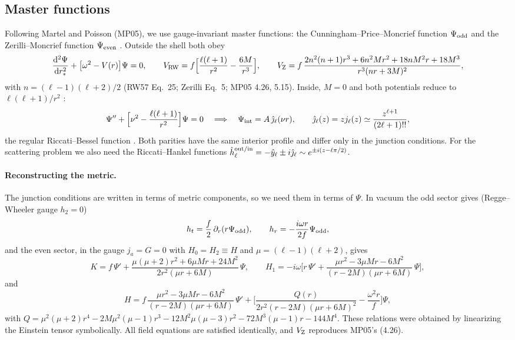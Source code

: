 \documentclass[11pt,a4paper]{article}
\numberwithin{equation}{section}
\newcommand{\dd}{\mathrm{d}}
\newcommand{\jh}{\hat\jmath_\ell}
\begin{document}
\subsection{Master functions}
Following Martel and Poisson \cite{MP05} (MP05), we use gauge-invariant master functions: the
Cunningham--Price--Moncrief function $\Psi_{\rm odd}$ \cite{CPM78} and the Zerilli--Moncrief function $\Psi_{\rm even}$
\cite{Moncrief74}. Outside the shell both obey
\begin{equation}
\frac{\dd^2\Psi}{\dd r_*^2}+\big[\omega^2-V(r)\big]\Psi=0,\qquad
V_{\rm RW}=f\Big[\frac{\ell(\ell+1)}{r^2}-\frac{6M}{r^3}\Big],\qquad
V_{\rm Z}=f\,\frac{2n^2(n+1)r^3+6n^2Mr^2+18nM^2r+18M^3}{r^3(nr+3M)^2},
\label{eq:master}
\end{equation}
with $n=(\ell-1)(\ell+2)/2$ (RW57 Eq.~25; Zerilli Eq.~5; MP05 4.26, 5.15). Inside, $M=0$ and both potentials reduce to
$\ell(\ell+1)/r^2$ \cite{ondas}:
\begin{equation}
\Psi''+\Big[\nu^2-\frac{\ell(\ell+1)}{r^2}\Big]\Psi=0\quad\Longrightarrow\quad
\Psi_{\rm int}=A\,\jh(\nu r),\qquad \jh(z)=zj_\ell(z)\simeq\frac{z^{\ell+1}}{(2\ell+1)!!},
\label{eq:int}
\end{equation}
the regular Riccati--Bessel function \cite{AS72,DLMF}. Both parities have the same interior profile and differ only in
the junction conditions. For the scattering problem we also need the Riccati--Hankel functions
$\hat h^{\rm out/in}_\ell=-\hat y_\ell\pm i\jh\sim e^{\pm i(z-\ell\pi/2)}$.

\paragraph{Reconstructing the metric.} The junction conditions are written in terms of metric components, so we need
them in terms of $\Psi$. In vacuum the odd sector gives (Regge--Wheeler gauge $h_2=0$)
\begin{equation}
h_t=\frac f2\,\partial_r(r\Psi_{\rm odd}),\qquad h_r=-\frac{i\omega r}{2f}\Psi_{\rm odd},
\label{eq:oddrecon}
\end{equation}
and the even sector, in the gauge $j_a=G=0$ with $H_0=H_2\equiv H$ and $\mu=(\ell-1)(\ell+2)$, gives
\begin{equation}
K=f\,\Psi'+\frac{\mu(\mu+2)r^2+6\mu Mr+24M^2}{2r^2(\mu r+6M)}\,\Psi,\qquad
H_1=-i\omega\Big[r\,\Psi'+\frac{\mu r^2-3\mu Mr-6M^2}{(r-2M)(\mu r+6M)}\,\Psi\Big],
\end{equation}
and
\begin{equation}
H=f\,\frac{\mu r^2-3\mu Mr-6M^2}{(r-2M)(\mu r+6M)}\,\Psi'+\Big[\frac{Q(r)}{2r^2(r-2M)(\mu r+6M)^2}-\frac{\omega^2r}{f}\Big]\Psi,
\end{equation}
with $Q=\mu^2(\mu+2)r^4-2M\mu^2(\mu-1)r^3-12M^2\mu(\mu-3)r^2-72M^3(\mu-1)r-144M^4$. These relations were obtained by
linearizing the Einstein tensor symbolically. All field equations are satisfied identically, and $V_{\rm Z}$
reproduces MP05's (4.26).
\end{document}
